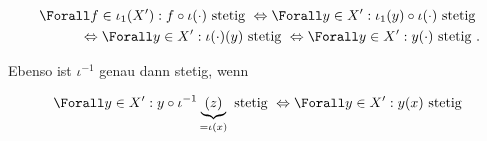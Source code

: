 \begin{solution}
\begin{enumerate}[label = (\arabic*)]
  \begin{align*}
    \Forall f \in \iota_1(X^{\prime}): f \circ \iota(\cdot) \text{~stetig~} \Leftrightarrow \Forall y \in X^{\prime}: \iota_1 (y) \circ \iota(\cdot) \text{~stetig~} \\
     \Leftrightarrow \Forall y \in X^{\prime}: \iota(\cdot)(y) \text{~stetig~} \Leftrightarrow \Forall y \in X^{\prime}: y(\cdot) \text{~stetig~}.
  \end{align*}

  Ebenso ist $\iota^{-1}$ genau dann stetig, wenn

  \begin{align*}
    \Forall y \in X^{\prime}: y \circ \iota^{-1}\underbrace{(z)}_{=\iota(x)} \text{~stetig~} \Leftrightarrow \Forall y \in X^{\prime}: y(x) \text{~stetig~}
  \end{align*}

\end{enumerate}


\end{solution}
